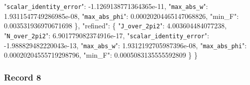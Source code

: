 \documentclass[
  10pt,
]{article}
\newenvironment{Shaded}{}{}
\newcommand{\DataTypeTok}[1]{\textcolor[rgb]{0.56,0.13,0.00}{#1}}
\newcommand{\FloatTok}[1]{\textcolor[rgb]{0.25,0.63,0.44}{#1}}
\newcommand{\FunctionTok}[1]{\textcolor[rgb]{0.02,0.16,0.49}{#1}}
\begin{document}
\begin{Shaded}
\begin{Highlighting}[]
    \DataTypeTok{"\nolinkurl{scalar_identity_error}"}\FunctionTok{:} \FloatTok{{-}1.1269138771364365e{-}11}\FunctionTok{,}
    \DataTypeTok{"\nolinkurl{max_abs_w}"}\FunctionTok{:} \FloatTok{1.9311547749286985e{-}08}\FunctionTok{,}
    \DataTypeTok{"\nolinkurl{max_abs_phi}"}\FunctionTok{:} \FloatTok{0.00020204465147068826}\FunctionTok{,}
    \DataTypeTok{"min\_F"}\FunctionTok{:} \FloatTok{0.003531936970671698}
  \FunctionTok{\},}
  \DataTypeTok{"refined"}\FunctionTok{:} \FunctionTok{\{}
    \DataTypeTok{"\nolinkurl{J_over_2pi2}"}\FunctionTok{:} \FloatTok{4.003604484077238}\FunctionTok{,}
    \DataTypeTok{"\nolinkurl{N_over_2pi2}"}\FunctionTok{:} \FloatTok{6.901779082374916e{-}17}\FunctionTok{,}
    \DataTypeTok{"\nolinkurl{scalar_identity_error}"}\FunctionTok{:} \FloatTok{{-}1.988829482220043e{-}13}\FunctionTok{,}
    \DataTypeTok{"\nolinkurl{max_abs_w}"}\FunctionTok{:} \FloatTok{1.9312192705987396e{-}08}\FunctionTok{,}
    \DataTypeTok{"\nolinkurl{max_abs_phi}"}\FunctionTok{:} \FloatTok{0.00020204555719298796}\FunctionTok{,}
    \DataTypeTok{"min\_F"}\FunctionTok{:} \FloatTok{0.0005083135555592809}
  \FunctionTok{\}}
\FunctionTok{\}}
\end{Highlighting}
\end{Shaded}

\hypertarget{record-8-1}{%
\subsubsection{Record 8}\label{record-8-1}}
\end{document}
